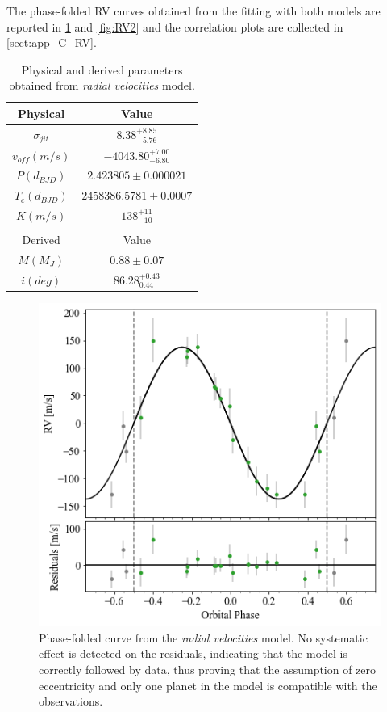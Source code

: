 \documentclass{aa}
\begin{document}
The phase-folded RV curves obtained from the fitting with both models 
are reported in \ref{fig:RV1} and \ref{fig:RV2} and the correlation plots 
are collected in \ref{sect:app_C_RV}.  
\begin{table}[H]
    \small
   \centering
       \begin{tabular}{cc}
       \hline
        Physical & Value \\
        \hline
		$\sigma_{jit}$ &     $8.38_{-5.76}^{+8.85}$ \\
		$v_{off} (m/s)$ &  $-4043.80_{-6.80}^{+7.00}$ \\
	    $P (d_{BJD})$   & $2.423805\pm0.000021$   \\
	    $T_c (d_{BJD})$  &$2458386.5781\pm0.0007$ \\
	    $K (m/s)$   &$138_{-10}^{+11}$\\
        \hline
        \\
	    \hline 
	    Derived & Value \\
	    \hline
        $M(M_J)$ & $0.88 \pm 0.07$ \\
        $i(deg)$ & $86.28_{0.44}^{+0.43}$\\
       \hline
       \end{tabular} 
     \caption{Physical and derived parameters obtained from \textit{radial velocities} model.}
\label{table:3}
\end{table}
\begin{figure}[H]
	\centering
	\includegraphics[scale=0.45, angle=0]{pictures/RV.png}
	\caption{Phase-folded curve from the \textit{radial velocities} model. No systematic effect is detected on the residuals, indicating that the model is correctly followed by data, thus proving that the assumption of zero eccentricity and only one planet in the model is compatible with the observations.}
	\label{fig:RV1}
\end{figure}
\end{document}
